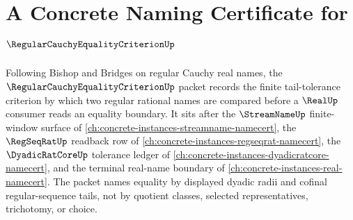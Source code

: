 \chapter{A Concrete Naming Certificate for $\RegularCauchyEqualityCriterionUp$}
\label{ch:concrete-instances-regular-cauchy-equality-criterion-namecert}

Following Bishop and Bridges on regular Cauchy real names, the $\RegularCauchyEqualityCriterionUp$ packet records the finite tail-tolerance criterion by which two regular rational names are compared before a $\RealUp$ consumer reads an equality boundary. It sits after the $\StreamNameUp$ finite-window surface of \autoref{ch:concrete-instances-streamname-namecert}, the $\RegSeqRatUp$ readback row of \autoref{ch:concrete-instances-regseqrat-namecert}, the $\DyadicRatCoreUp$ tolerance ledger of \autoref{ch:concrete-instances-dyadicratcore-namecert}, and the terminal real-name boundary of \autoref{ch:concrete-instances-real-namecert}. The packet names equality by displayed dyadic radii and cofinal regular-sequence tails, not by quotient classes, selected representatives, trichotomy, or choice.

